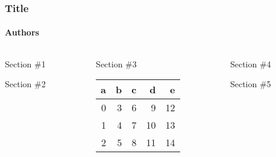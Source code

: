 \documentclass{beamer}
\begin{document}
\begin{frame}[t]

  \frametitle{\vspace{-0.75cm} \newline Title}
  \framesubtitle{Authors \newline \vspace{0.05cm}}

  \begin{columns}[t]


    \begin{column}{.3\textwidth}

      \begin{block}{Section \#1}
        \blindtext
      \end{block}

      \vspace{1.5cm}

      \begin{block}{Section \#2}
        \blindtext
      \end{block}

    \end{column}


    \begin{column}{.3\textwidth}

      \begin{block}{Section \#3}

        \blindtext[2]

        \setlength{\tabcolsep}{22pt} %
        \vspace{1em}
        \centering
        \begin{tabular}{rrrrr}
          \toprule
          a & b & c & d & e\\
          \midrule
          0 & 3 & 6 & 9  & 12 \\
          1 & 4 & 7 & 10 & 13 \\
          2 & 5 & 8 & 11 & 14 \\
          \bottomrule
        \end{tabular}

      \end{block}
      
    \end{column}


    \begin{column}{.3\textwidth}

      \begin{block}{Section \#4}
        \blindtext


      \end{block}

      \vspace{1.5cm}

      \begin{block}{Section \#5}
        \blindtext
      \end{block}

    \end{column}

  \end{columns}

\end{frame}
\end{document}
